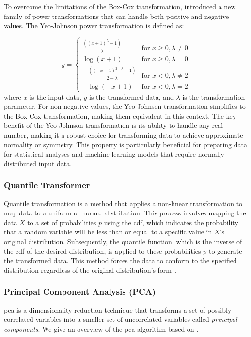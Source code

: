 To overcome the limitations of the Box-Cox transformation, \citet{YeoJohnson} introduced a new family of power transformations that can handle both positive and negative values.
The Yeo-Johnson power transformation is defined as:

$$
y =
\begin{cases}
\frac{((x + 1)^\lambda - 1)}{\lambda} & \text{for } x \geq 0, \lambda \neq 0 \\
\log(x + 1) & \text{for } x \geq 0, \lambda = 0 \\
-\frac{((-x + 1)^{2 - \lambda} - 1)}{2 - \lambda} & \text{for } x < 0, \lambda \neq 2 \\
-\log(-x + 1) & \text{for } x < 0, \lambda = 2
\end{cases}
$$
where $x$ is the input data, $y$ is the transformed data, and $\lambda$ is the transformation parameter.
For non-negative values, the Yeo-Johnson transformation simplifies to the Box-Cox transformation, making them equivalent in this context.
The key benefit of the Yeo-Johnson transformation is its ability to handle any real number, making it a robust choice for transforming data to achieve approximate normality or symmetry.
This property is particularly beneficial for preparing data for statistical analyses and machine learning models that require normally distributed input data.

\subsubsection{Quantile Transformer}
Quantile transformation is a method that applies a non-linear transformation to map data to a uniform or normal distribution.
This process involves mapping the data $X$ to a set of probabilities $p$ using the \gls{cdf}, which indicates the probability that a random variable will be less than or equal to a specific value in $X$'s original distribution.
Subsequently, the quantile function, which is the inverse of the \gls{cdf} of the desired distribution, is applied to these probabilities $p$ to generate the transformed data.
This method forces the data to conform to the specified distribution regardless of the original distribution's form~\cite{Vasques2024}.

\subsubsection{Principal Component Analysis (PCA)}\label{subsec:pca}
\gls{pca} is a dimensionality reduction technique that transforms a set of possibly correlated variables into a smaller set of uncorrelated variables called \textit{principal components}.
We give an overview of the \gls{pca} algorithm based on \citet{James2023AnIS}.

